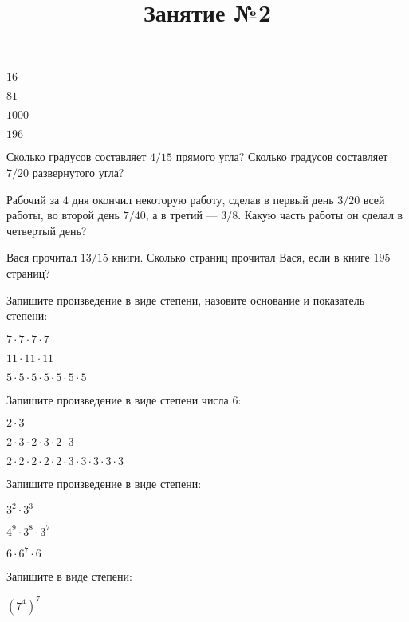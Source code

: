 \begin{listofex}
	\begin{enumcols}[itemcolumns=4]
		\item \( 16 \)
		\item \( 81 \)
		\item \( 1000 \)
		\item \( 196 \)
	\end{enumcols}
	\item Сколько градусов составляет \( 4/15 \) прямого угла? Сколько градусов составляет \( 7/20 \) развернутого угла?
	\item Рабочий за \( 4 \) дня окончил некоторую работу, сделав в первый день \( 3/20 \) всей работы, во второй день \( 7/40 \), а в третий --- \( 3/8 \). Какую часть работы он сделал в четвертый день?
\end{listofex}
\newpage
\title{Занятие №2}
\begin{listofex}
	\item Вася прочитал \( 13/15 \) книги. Сколько страниц прочитал Вася, если в книге \( 195 \) страниц?
	\item Запишите произведение в виде степени, назовите основание и показатель степени:
	\begin{enumcols}[itemcolumns=3]
		\item \( 7\cdot7\cdot7\cdot7 \)
		\item \( 11\cdot11\cdot11 \)
		\item \( 5\cdot5\cdot5\cdot5\cdot5\cdot5\cdot5 \)
	\end{enumcols}
	\item Запишите произведение в виде степени числа \( 6 \):
	\begin{enumcols}[itemcolumns=3]
		\item \( 2\cdot3 \)
		\item \( 2\cdot3\cdot2\cdot3\cdot2\cdot3 \)
		\item \( 2\cdot2\cdot2\cdot2\cdot2\cdot3\cdot3\cdot3\cdot3\cdot3 \)
	\end{enumcols}
	\item Запишите произведение в виде степени:
	\begin{enumcols}[itemcolumns=3]
		\item \( 3^2\cdot3^3 \)
		\item \( 4^9\cdot3^8\cdot3^7 \)
		\item \( 6\cdot6^7\cdot6 \)
	\end{enumcols}
	\item Запишите в виде степени:
	\begin{enumcols}[itemcolumns=2]
		\item \( (7^4)^7 \)

\end{enumcols}
\end{listofex}
